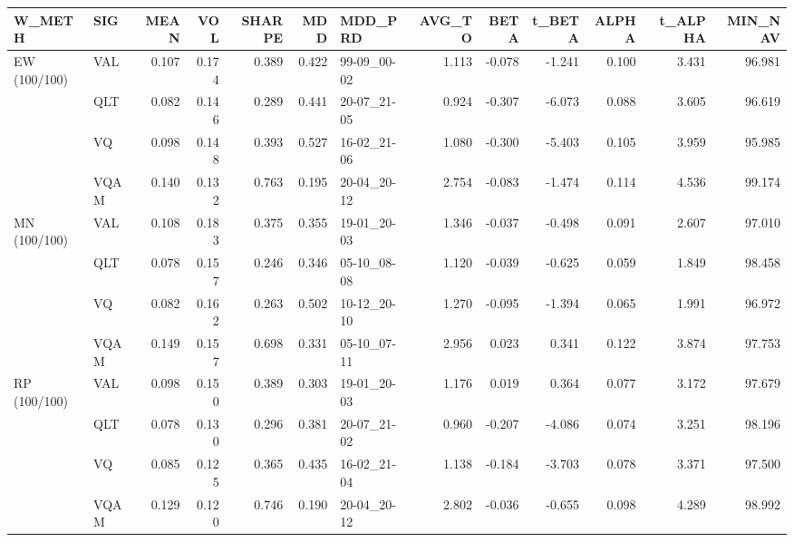 \begin{tabular}{llrrrrlrrrrrr}
\toprule
W\_METH & SIG & MEAN & VOL & SHARPE & MDD & MDD\_PRD & AVG\_TO & BETA & t\_BETA & ALPHA & t\_ALPHA & MIN\_NAV \\
\midrule
EW (100/100) & VAL & 0.107 & 0.174 & 0.389 & 0.422 & 99-09\_00-02 & 1.113 & -0.078 & -1.241 & 0.100 & 3.431 & 96.981 \\
 & QLT & 0.082 & 0.146 & 0.289 & 0.441 & 20-07\_21-05 & 0.924 & -0.307 & -6.073 & 0.088 & 3.605 & 96.619 \\
 & VQ & 0.098 & 0.148 & 0.393 & 0.527 & 16-02\_21-06 & 1.080 & -0.300 & -5.403 & 0.105 & 3.959 & 95.985 \\
 & VQAM & 0.140 & 0.132 & 0.763 & 0.195 & 20-04\_20-12 & 2.754 & -0.083 & -1.474 & 0.114 & 4.536 & 99.174 \\
MN (100/100) & VAL & 0.108 & 0.183 & 0.375 & 0.355 & 19-01\_20-03 & 1.346 & -0.037 & -0.498 & 0.091 & 2.607 & 97.010 \\
 & QLT & 0.078 & 0.157 & 0.246 & 0.346 & 05-10\_08-08 & 1.120 & -0.039 & -0.625 & 0.059 & 1.849 & 98.458 \\
 & VQ & 0.082 & 0.162 & 0.263 & 0.502 & 10-12\_20-10 & 1.270 & -0.095 & -1.394 & 0.065 & 1.991 & 96.972 \\
 & VQAM & 0.149 & 0.157 & 0.698 & 0.331 & 05-10\_07-11 & 2.956 & 0.023 & 0.341 & 0.122 & 3.874 & 97.753 \\
RP (100/100) & VAL & 0.098 & 0.150 & 0.389 & 0.303 & 19-01\_20-03 & 1.176 & 0.019 & 0.364 & 0.077 & 3.172 & 97.679 \\
 & QLT & 0.078 & 0.130 & 0.296 & 0.381 & 20-07\_21-02 & 0.960 & -0.207 & -4.086 & 0.074 & 3.251 & 98.196 \\
 & VQ & 0.085 & 0.125 & 0.365 & 0.435 & 16-02\_21-04 & 1.138 & -0.184 & -3.703 & 0.078 & 3.371 & 97.500 \\
 & VQAM & 0.129 & 0.120 & 0.746 & 0.190 & 20-04\_20-12 & 2.802 & -0.036 & -0.655 & 0.098 & 4.289 & 98.992 \\
\bottomrule
\end{tabular}
